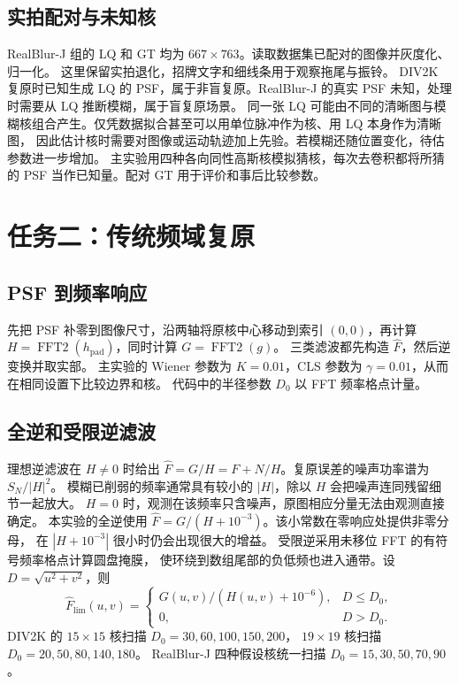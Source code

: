 \documentclass[UTF8,a4paper,zihao=5,fontset=fandol,twoside]{ctexart}
\begin{document}
\subsection{实拍配对与未知核}
RealBlur-J 组的 LQ 和 GT 均为 \(667\times763\)。读取数据集已配对的图像并灰度化、归一化。
这里保留实拍退化，招牌文字和细线条用于观察拖尾与振铃。
DIV2K 复原时已知生成 LQ 的 PSF，属于非盲复原。RealBlur-J 的真实 PSF 未知，处理时需要从 LQ 推断模糊，属于盲复原场景。
同一张 LQ 可能由不同的清晰图与模糊核组合产生。仅凭数据拟合甚至可以用单位脉冲作为核、用 LQ 本身作为清晰图，
因此估计核时需要对图像或运动轨迹加上先验。若模糊还随位置变化，待估参数进一步增加。
主实验用四种各向同性高斯核模拟猜核，每次去卷积都将所猜的 PSF 当作已知量。配对 GT 用于评价和事后比较参数。

\section{任务二：传统频域复原}
\subsection{PSF 到频率响应}
先把 PSF 补零到图像尺寸，沿两轴将原核中心移动到索引 \((0,0)\)，再计算
\(H=\operatorname{FFT2}(h_{\mathrm{pad}})\)，同时计算 \(G=\operatorname{FFT2}(g)\)。
三类滤波都先构造 \(\widehat F\)，然后逆变换并取实部。
主实验的 Wiener 参数为 \(K=0.01\)，CLS 参数为 \(\gamma=0.01\)，从而在相同设置下比较边界和核。
代码中的半径参数 \(D_0\) 以 FFT 频率格点计量。

\subsection{全逆和受限逆滤波}
理想逆滤波在 \(H\ne0\) 时给出 \(\widehat F=G/H=F+N/H\)。复原误差的噪声功率谱为 \(S_N/|H|^2\)。
模糊已削弱的频率通常具有较小的 \(|H|\)，除以 \(H\) 会把噪声连同残留细节一起放大。
\(H=0\) 时，观测在该频率只含噪声，原图相应分量无法由观测直接确定。
本实验的全逆使用 \(\widehat F=G/(H+10^{-3})\)。该小常数在零响应处提供非零分母，
在 \(|H+10^{-3}|\) 很小时仍会出现很大的增益。
受限逆采用未移位 FFT 的有符号频率格点计算圆盘掩膜，
使环绕到数组尾部的负低频也进入通带。设 \(D=\sqrt{u^2+v^2}\)，则
\begin{equation}
\widehat F_{\mathrm{lim}}(u,v)=
\begin{cases}
G(u,v)/(H(u,v)+10^{-6}), & D\le D_0,\\
0, & D>D_0.
\end{cases}
\end{equation}
DIV2K 的 \(15\times15\) 核扫描 \(D_0=30,60,100,150,200\)，
\(19\times19\) 核扫描 \(D_0=20,50,80,140,180\)。
RealBlur-J 四种假设核统一扫描 \(D_0=15,30,50,70,90\)。
\end{document}
